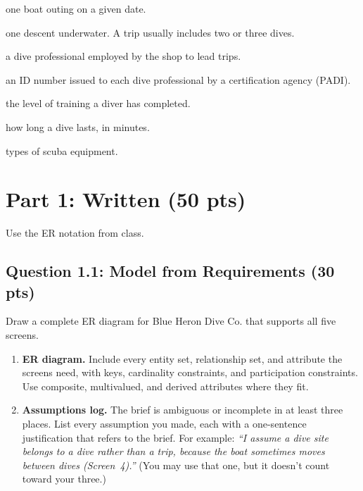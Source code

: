 \documentclass[11pt]{article}
\newcommand{\pts}[1]{\hfill\textbf{(#1 pts)}}
\begin{document}
\begin{infobox}[title=Glossary for non-divers]
\begin{description}[nosep,leftmargin=0pt,labelsep=0.5em]
  \item[Trip:] one boat outing on a given date.
  \item[Dive:] one descent underwater. A trip usually includes two or three dives.
  \item[Divemaster:] a dive professional employed by the shop to lead trips.
  \item[PADI professional number:] an ID number issued to each dive professional by a
    certification agency (PADI).
  \item[Certification level:] the level of training a diver has completed.
  \item[Bottom time:] how long a dive lasts, in minutes.
  \item[BCD, regulator, dive computer:] types of scuba equipment.
\end{description}
\end{infobox}

\section*{Part 1: Written \hfill (50 pts)}

Use the ER notation from class.

\subsection*{Question 1.1: Model from Requirements \pts{30}}

Draw a complete ER diagram for Blue Heron Dive Co. that supports all five screens.

\begin{enumerate}[label=(\alph*)]
  \item \textbf{ER diagram.} Include every entity set, relationship set, and attribute the screens need,
    with keys, cardinality constraints, and participation constraints. Use composite, multivalued,
    and derived attributes where they fit.
  \item \textbf{Assumptions log.} The brief is ambiguous or incomplete in at least three places.
    List every assumption you made, each with a one-sentence justification that refers to the brief.
    For example: \emph{``I assume a dive site belongs to a dive rather than a trip, because the boat
    sometimes moves between dives (Screen~4).''} (You may use that one, but it doesn't count toward
    your three.)
\end{enumerate}
\end{document}
